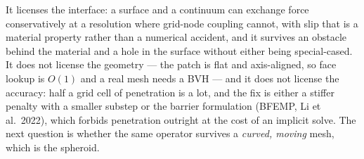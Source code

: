 \documentclass[10pt,a4paper]{article}
\begin{document}
It licenses the interface: a surface and a continuum can exchange force conservatively at a resolution
where grid-node coupling cannot, with slip that is a material property rather than a numerical
accident, and it survives an obstacle behind the material and a hole in the surface without either
being special-cased. It does not license the geometry --- the patch is flat and axis-aligned, so face lookup is
$O(1)$ and a real mesh needs a BVH --- and it does not license the accuracy: half a grid cell of
penetration is a lot, and the fix is either a stiffer penalty with a smaller substep or the barrier
formulation (BFEMP, Li et al.\ 2022), which forbids penetration outright at the cost of an implicit
solve. The next question is whether the same operator survives a \emph{curved, moving} mesh, which is
the spheroid.
\end{document}
